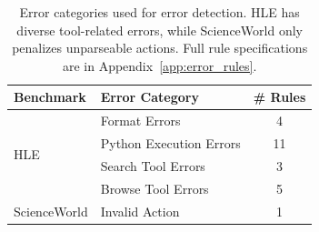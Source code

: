 \begin{table}[t]
\centering
\small
\begin{tabular}{llc}
\toprule
\textbf{Benchmark} & \textbf{Error Category} & \textbf{\# Rules} \\
\midrule
\multirow{4}{*}{HLE} & Format Errors & 4 \\
 & Python Execution Errors & 11 \\
 & Search Tool Errors & 3 \\
 & Browse Tool Errors & 5 \\
\midrule
ScienceWorld & Invalid Action & 1 \\
\bottomrule
\end{tabular}
\caption{Error categories used for error detection. HLE has diverse tool-related errors, while ScienceWorld only penalizes unparseable actions. Full rule specifications are in Appendix~\ref{app:error_rules}.}
\label{tab:error_categories}
\vspace{-1.0em}
\end{table}
